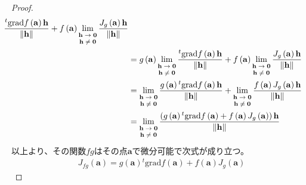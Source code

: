 \documentclass[dvipdfmx]{jsarticle}
\begin{document}
\begin{proof}
\begin{align*}
{\begin{matrix}
\end{matrix}}\frac{{}^{t}\mathrm{grad}f\left( \mathbf{a} \right)\mathbf{h}}{\left\| \mathbf{h} \right\|} + f\left( \mathbf{a} \right)\lim_{\scriptsize \begin{matrix}
\mathbf{h} \rightarrow \mathbf{0} \\
\mathbf{h} \neq \mathbf{0} \\
\end{matrix}}\frac{J_{g}\left( \mathbf{a} \right)\mathbf{h}}{\left\| \mathbf{h} \right\|}\\
&= g\left( \mathbf{a} \right)\lim_{\scriptsize \begin{matrix}
\mathbf{h} \rightarrow \mathbf{0} \\
\mathbf{h} \neq \mathbf{0} \\
\end{matrix}}\frac{{}^{t}\mathrm{grad}f\left( \mathbf{a} \right)\mathbf{h}}{\left\| \mathbf{h} \right\|} + f\left( \mathbf{a} \right)\lim_{\scriptsize \begin{matrix}
\mathbf{h} \rightarrow \mathbf{0} \\
\mathbf{h} \neq \mathbf{0} \\
\end{matrix}}\frac{J_{g}\left( \mathbf{a} \right)\mathbf{h}}{\left\| \mathbf{h} \right\|}\\
&= \lim_{\scriptsize \begin{matrix}
\mathbf{h} \rightarrow \mathbf{0} \\
\mathbf{h} \neq \mathbf{0} \\
\end{matrix}}\frac{g\left( \mathbf{a} \right){}^{t}\mathrm{grad}f\left( \mathbf{a} \right)\mathbf{h}}{\left\| \mathbf{h} \right\|} + \lim_{\scriptsize \begin{matrix}
\mathbf{h} \rightarrow \mathbf{0} \\
\mathbf{h} \neq \mathbf{0} \\
\end{matrix}}\frac{f\left( \mathbf{a} \right)J_{g}\left( \mathbf{a} \right)\mathbf{h}}{\left\| \mathbf{h} \right\|}\\
&= \lim_{\scriptsize \begin{matrix}
\mathbf{h} \rightarrow \mathbf{0} \\
\mathbf{h} \neq \mathbf{0} \\
\end{matrix}}\frac{\left( g\left( \mathbf{a} \right){}^{t}\mathrm{grad}f\left( \mathbf{a} \right) + f\left( \mathbf{a} \right)J_{g}\left( \mathbf{a} \right) \right)\mathbf{h}}{\left\| \mathbf{h} \right\|}
\end{align*}
以上より、その関数$fg$はその点$\mathbf{a}$で微分可能で次式が成り立つ。
\begin{align*}
J_{fg}\left( \mathbf{a} \right) = g\left( \mathbf{a} \right){}^{t}\mathrm{grad}f\left( \mathbf{a} \right) + f\left( \mathbf{a} \right)J_{g}\left( \mathbf{a} \right)
\end{align*}
\end{proof}
\end{document}
